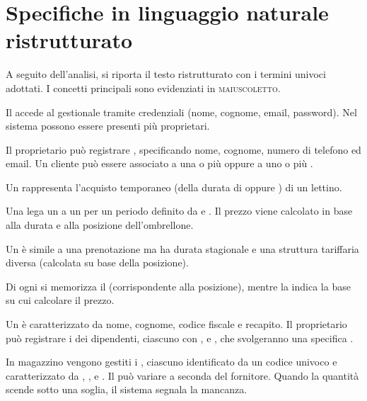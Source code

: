 \section{Specifiche in linguaggio naturale ristrutturato}

A seguito dell'analisi, si riporta il testo ristrutturato con i termini univoci
adottati. I concetti principali sono evidenziati in \textsc{maiuscoletto}.

\medskip
\begin{tcolorbox}[breakable, colback=lightgray, colframe=primary!40, left=8pt, right=8pt,
                  top=6pt, bottom=6pt]
\setlength{\parskip}{6pt}

Il  accede al gestionale tramite credenziali (nome, cognome,
email, password). Nel sistema possono essere presenti più proprietari.

Il proprietario può registrare , specificando nome, cognome,
numero di telefono ed email. Un cliente può essere associato a una o più
 oppure a uno o più .

Un  rappresenta l'acquisto temporaneo (della durata di  
oppure ) di un lettino.

Una  lega un  a un  
per un periodo definito da  e . 
Il prezzo viene calcolato in base alla durata e alla posizione dell'ombrellone.

Un  è simile a una prenotazione ma ha durata stagionale
e una struttura tariffaria diversa (calcolata su base della posizione).

Di ogni  si memorizza il  (corrispondente alla posizione), 
mentre la  indica la base su cui calcolare il prezzo.

Un  è caratterizzato da nome, cognome, codice fiscale e
recapito. Il proprietario può registrare i  dei dipendenti,
ciascuno con ,  e ,
che svolgeranno una specifica .

In magazzino vengono gestiti i , ciascuno identificato da un codice 
univoco e caratterizzato da , , 
e . Il  può variare a seconda del fornitore.
Quando la quantità scende sotto una soglia, il sistema segnala la mancanza.


\end{tcolorbox}
